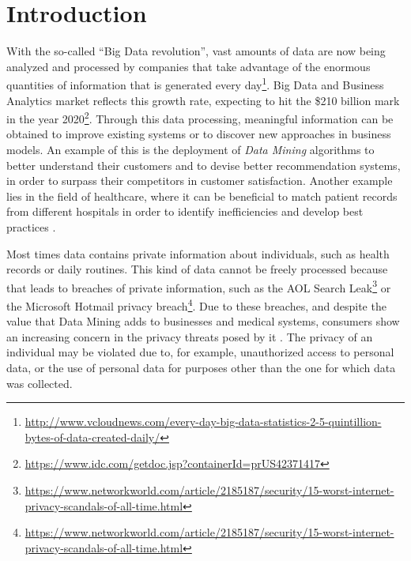 %

\acresetall

\chapter{Introduction}
\label{ch:Introduction}



With the so-called ``Big Data revolution'', vast amounts of data are now being analyzed and processed by companies that take advantage of the enormous quantities of information that is generated every day\footnote{\url{http://www.vcloudnews.com/every-day-big-data-statistics-2-5-quintillion-bytes-of-data-created-daily/}}. Big Data and Business Analytics market reflects this growth rate, expecting to hit the \$210 billion mark in the year 2020\footnote{\url{https://www.idc.com/getdoc.jsp?containerId=prUS42371417}}.
Through this data processing, meaningful information can be obtained to improve existing systems or to discover new approaches in business models. An example of this is the deployment of \textit{Data Mining} algorithms to better understand their customers and to devise better recommendation systems, in order to surpass their competitors in customer satisfaction. Another example lies in the field of healthcare, where it can be beneficial to match patient records from different hospitals in order to identify inefficiencies and develop best practices \cite{Lu2014}. 

Most times data contains private information about individuals, such as health records or daily routines. This kind of data cannot be freely processed because that leads to breaches of private information, such as the AOL Search Leak\footnote{\url{https://www.networkworld.com/article/2185187/security/15-worst-internet-privacy-scandals-of-all-time.html}} or the Microsoft Hotmail privacy breach\footnote{\url{https://www.networkworld.com/article/2185187/security/15-worst-internet-privacy-scandals-of-all-time.html}}. Due to these breaches, and despite the value that Data Mining adds to businesses and medical systems, consumers show an increasing concern in the privacy threats posed by it \cite{brankovic1999privacy}. The privacy of an individual may be violated due to, for example, unauthorized access to personal data, or the use of personal data for purposes other than the one for which data was collected.

